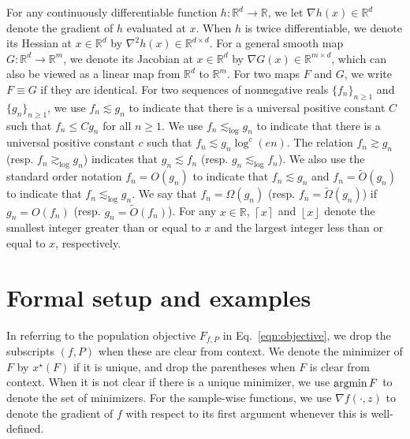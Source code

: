 \documentclass[11pt,twoside]{article}
\numberwithin{equation}{section}
\newcommand{\RR}{\mathbb{R}}
\newcommand{\ceil}[1]{\left \lceil #1 \right \rceil }
\newcommand{\floor}[1]{\left \lfloor #1 \right \rfloor }
\newcommand{\1}{\mathbf{1}}
\newcommand{\argmin}{\operatornamewithlimits{argmin}}
\theoremstyle{remark}
\theoremstyle{plain}
\begin{document}
For any continuously differentiable function $h:\RR^d \rightarrow \RR$, we let $\nabla h(x) \in \mathbb{R}^d$ denote the gradient of $h$ evaluated at $x$. When $h$ is twice differentiable, we denote its Hessian at $x \in \RR^d$ by $\nabla^2 h(x) \in \mathbb{R}^{d \times d}$. For a general smooth map $G:\RR^d \rightarrow \RR^m$, we denote its Jacobian at $x \in \RR^d$ by $\nabla G(x)  \in \RR^{m\times d}$, which can also be viewed as a linear map from $\RR^d$ to $\RR^m$. For two maps $F$ and $G$, we write $F\equiv G$ if they are identical. For two sequences of nonnegative reals $\{f_n\}_{n\ge 1}$ and $\{g_n\}_{n\ge 1}$, we use $f_n \lesssim g_n$ to indicate that there is a universal positive constant $C$ such that $f_n \le C g_n$ for all $n \ge 1$. We use $f_n \lesssim_{\log} g_n$ to indicate that there is a universal positive constant $c$ such that $f_n \lesssim  g_n \log^c (en) $. The relation $f_n \gtrsim g_n$ (resp. $f_n \gtrsim_{\log} g_n$) indicates that $g_n \lesssim f_n$ (resp. $g_n \lesssim_{\log} f_n$). We also use the standard order notation $f_n = O(g_n)$ to indicate that $f_n \lesssim g_n$ and $f_n = \tilde O(g_n)$ to indicate that $f_n \lesssim_{\log} g_n $. We say that $f_n = \Omega(g_n)$ (resp. $f_n = \tilde \Omega(g_n)$) if $g_n = O(f_n)$ (resp. $g_n = \tilde O(f_n)$).	For any \(x \in \RR\), \(\ceil{x}\) and \(\floor{x}\) denote the smallest integer greater than or equal to \(x\) and the largest integer less than or equal to \(x\), respectively.

\section{Formal setup and examples}\label{sec:background}

In referring to the population objective $F_{f,P}$ in Eq.~\eqref{eqn:objective}, we drop the subscripts $(f,P)$ when these are clear from context. We denote the minimizer of $F$ by $x^\star(F)$ if it is unique, and drop the parentheses when $F$ is clear from context. When it is not clear if there is a unique minimizer, we use $\argmin F$ to denote the set of minimizers. For the sample-wise functions, we use $\nabla f(\cdot,z)$ to denote the gradient of $f$ with respect to its first argument  whenever this is well-defined.
\end{document}
